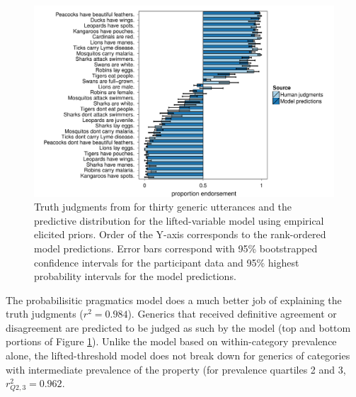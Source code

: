 \documentclass[10pt,letterpaper]{article}
\begin{document}
\begin{figure}
\centering
    \includegraphics[width=\columnwidth]{tj_n100-postPred-byItem.pdf}
    \caption{Truth judgments from for thirty generic utterances and the predictive distribution for the lifted-variable model using empirical elicited priors. Order of the Y-axis corresponds to the rank-ordered model predictions. Error bars correspond with 95\% bootstrapped confidence intervals for the participant data and 95\% highest probability intervals for the model predictions.}
  \label{fig:modeldataBars}
\end{figure}


The probabilisitic pragmatics model does a much better job of explaining the truth judgments ($r^2=0.984$). 
Generics that received definitive agreement or disagreement are predicted to be judged as such by the model (top and bottom portions of Figure \ref{fig:modeldataBars}). Unlike the model based on within-category prevalence alone, the lifted-threshold model does not break down for generics of categories with intermediate prevalence of the property (for prevalence quartiles 2 and 3, $r_{Q2,3}^2=0.962$. 
\end{document}
